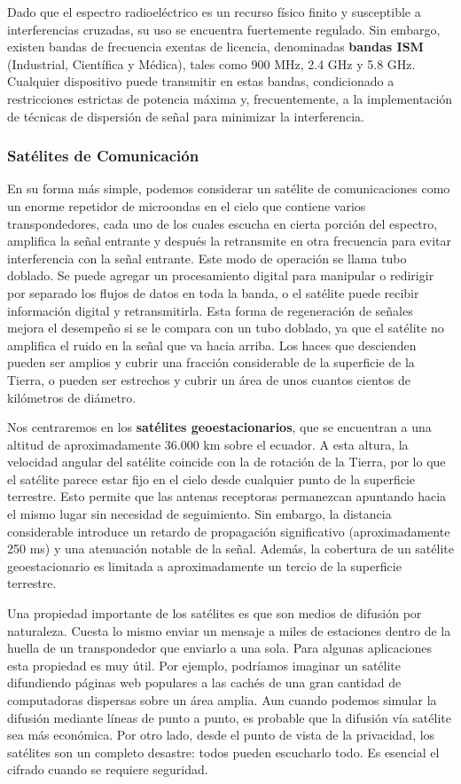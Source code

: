 Dado que el espectro radioeléctrico es un recurso físico finito y susceptible a interferencias cruzadas, su uso se encuentra fuertemente regulado. Sin embargo, existen bandas de frecuencia exentas de licencia, denominadas \textbf{bandas ISM} (Industrial, Científica y Médica), tales como 900 MHz, 2.4 GHz y 5.8 GHz. Cualquier dispositivo puede transmitir en estas bandas, condicionado a restricciones estrictas de potencia máxima y, frecuentemente, a la implementación de técnicas de dispersión de señal para minimizar la interferencia.

\subsubsection{Satélites de Comunicación}

En su forma más simple, podemos considerar un satélite de comunicaciones como un enorme repetidor de microondas en el cielo que contiene varios transpondedores, cada uno de los cuales escucha en cierta porción del espectro, amplifica la señal entrante y después la retransmite en otra
frecuencia para evitar interferencia con la señal entrante. Este modo de operación se llama tubo doblado. Se puede agregar un procesamiento digital para manipular o redirigir por separado los flujos de datos en toda la banda, o el satélite puede recibir información digital y retransmitirla. Esta forma de regeneración de señales mejora el desempeño si se le compara con un tubo doblado, ya que el satélite no amplifica el ruido en la señal que va hacia arriba. Los haces que descienden pueden ser amplios y cubrir una fracción considerable de la superficie de la Tierra, o pueden ser estrechos y cubrir un área de unos cuantos cientos de kilómetros de diámetro.

Nos centraremos en los \textbf{satélites geoestacionarios}, que se encuentran a una altitud de aproximadamente 36.000 km sobre el ecuador. A esta altura, la velocidad angular del satélite coincide con la de rotación de la Tierra, por lo que el satélite parece estar fijo en el cielo desde cualquier punto de la superficie terrestre. Esto permite que las antenas receptoras permanezcan apuntando hacia el mismo lugar sin necesidad de seguimiento. Sin embargo, la distancia considerable introduce un retardo de propagación significativo (aproximadamente 250 ms) y una atenuación notable de la señal. Además, la cobertura de un satélite geoestacionario es limitada a aproximadamente un tercio de la superficie terrestre.

Una propiedad importante de los satélites es que son medios de difusión por naturaleza. Cuesta lo mismo enviar un mensaje a miles de estaciones dentro de la huella de un transpondedor que enviarlo a una sola. Para algunas aplicaciones esta propiedad es muy útil. Por ejemplo, podríamos imaginar un satélite difundiendo páginas web populares a las cachés de una gran cantidad de computadoras dispersas sobre un área amplia. Aun cuando podemos simular la difusión mediante líneas de punto a punto, es probable que la difusión vía satélite sea más económica. Por otro lado, desde el punto de vista de la privacidad, los satélites son un completo desastre: todos pueden escucharlo todo. Es esencial el cifrado cuando se requiere seguridad.

